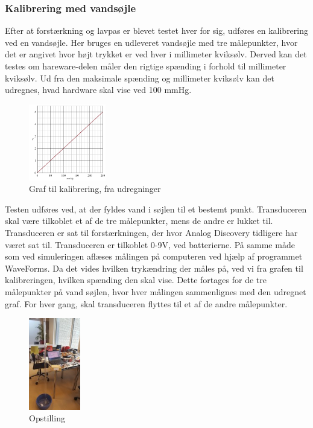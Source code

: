 \subsubsection{Kalibrering med vandsøjle}
Efter at forstærkning og lavpas er blevet testet hver for sig, udføres en kalibrering ved en vandsøjle. Her bruges en udleveret vandsøjle med tre målepunkter, hvor det er angivet hvor højt trykket er ved hver i millimeter kviksølv. Derved kan det testes om hareware-delen måler den rigtige spænding i forhold til millimeter kviksølv. Ud fra den maksimale spænding og millimeter kviksølv kan det udregnes, hvad hardware skal vise ved 100 mmHg. 
\begin{figure}[H]
	\centering
	\includegraphics[width=0.3\textwidth]{Figurer/graf_vandtest}
	\caption{Graf til kalibrering, fra udregninger}
	\label{fig:graf_vandtest}
\end{figure}
Testen udføres ved, at der fyldes vand i søjlen til et bestemt punkt. Transduceren skal være tilkoblet et af de tre målepunkter, mens de andre er lukket til. Transduceren er sat til forstærkningen, der hvor Analog Discovery tidligere har været sat til. Transduceren er tilkoblet 0-9V, ved batterierne. På samme måde som ved simuleringen aflæses målingen på computeren ved hjælp af programmet WaveForms. Da det vides hvilken trykændring der måles på, ved vi fra grafen til kalibreringen, hvilken spænding den skal vise. Dette fortages for de tre målepunkter på vand søjlen, hvor hver målingen sammenlignes med den udregnet graf. For hver gang, skal transduceren flyttes til et af de andre målepunkter.  
\begin{figure}[H]
	\centering
	\includegraphics[width=0.2\textwidth]{Figurer/vandtest3}
	\caption{Opstilling}
	\label{fig:vandtest}
\end{figure} 
